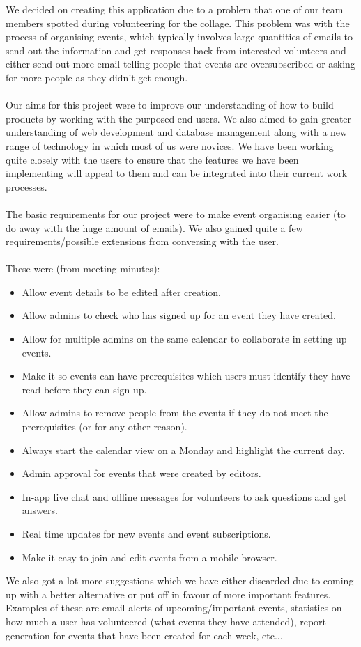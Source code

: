 \documentclass[10pt,a4paper]{article}
\begin{document}
\noindent We decided on creating this application due to a problem that one of 
our team members spotted during volunteering for the collage. This problem was 
with the process of organising events, which typically involves large quantities of 
emails to send out the information and get responses back from interested 
volunteers and either send out more email telling people that events are oversubscribed or 
asking for more people as they didn't get enough.
\\
\\
\noindent Our aims for this project were to improve our understanding of how to 
build products by working with the purposed end users. We also aimed to gain 
greater understanding of web development and database management along with a new 
range of technology in which most of us were novices. We have been working quite 
closely with the users to ensure that the features we have been implementing 
will appeal to them and can be integrated into their current work processes.
\\
\\
\noindent The basic requirements for our project were to make event organising 
easier (to do away with the huge amount of emails). We also gained quite a few 
requirements/possible extensions from conversing with the user.
\\
\\
\noindent These were (from meeting minutes):
\begin{itemize}
\setlength\itemsep{0.1em}
\item Allow event details to be edited after creation.
\item Allow admins to check who has signed up for an event they have created.
\item Allow for multiple admins on the same calendar to collaborate in setting 
up events. 
\item Make it so events can have prerequisites which users must identify they 
have read before they can sign up.
\item Allow admins to remove people from the events if they do not meet the 
prerequisites (or for any other reason).
\item Always start the calendar view on a Monday and highlight the current day.
\item Admin approval for events that were created by editors.
\item In-app live chat and offline messages for volunteers to ask questions and 
get answers.
\item Real time updates for new events and event subscriptions.
\item Make it easy to join and edit events from a mobile browser.  
\end{itemize}
\noindent We also got a lot more suggestions which we have either discarded due 
to coming up with a better alternative or put off in favour of more important 
features. Examples of these are email alerts of upcoming/important events, 
statistics on how much a user has volunteered (what events they have attended), 
report generation for events that have been created for each week, etc...
\end{document}
